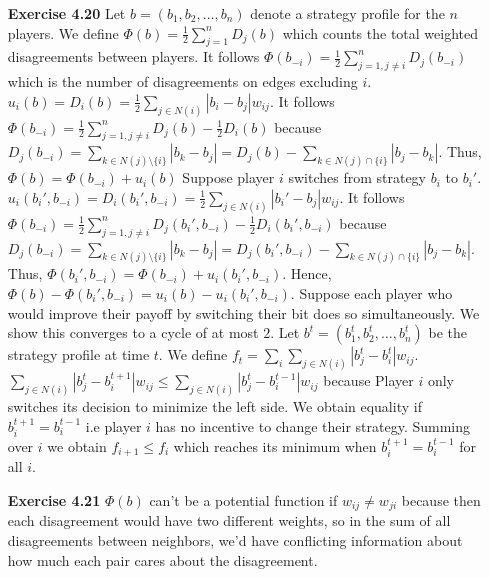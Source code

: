 \documentclass[10pt]{article}[H]
\begin{document}
\begin{itemize}
    \item [\textbf{Exercise 4.20}] Let $b=(b_1,b_2,\ldots,b_n)$ denote a strategy profile for the $n$ players. 
    We define $\Phi(b)=\frac{1}{2}\displaystyle\sum_{j=1}^{n}D_j(b)$ which counts the total weighted disagreements between players.
    It follows $\Phi(b_{-i})=\frac{1}{2}\displaystyle\sum_{j=1,j\neq i}^{n}D_j(b_{-i})$ which is the number of disagreements on edges excluding $i$.
    $u_i(b)=D_i(b)=\frac{1}{2}\sum_{j\in N(i)}|b_i-b_j|w_{ij}$.
    It follows $\Phi(b_{-i})=\frac{1}{2}\displaystyle\sum_{j=1,j\neq i}^{n}D_j(b)-\frac{1}{2}D_i(b)$ because $D_j(b_{-i})=\sum_{k\in N(j)\setminus\{i\}}|b_k-b_j|=D_j(b)-\sum_{k\in N(j)\cap\{i\}}|b_j-b_k|$.
    Thus, $\Phi(b)=\Phi(b_{-i})+u_i(b)$
    Suppose player $i$ switches from strategy $b_i$ to $b_i'$.
    $u_i(b_i',b_{-i})=D_i(b_i',b_{-i})=\frac{1}{2}\sum_{j\in N(i)}|b_i'-b_j|w_{ij}$.
    It follows $\Phi(b_{-i})=\frac{1}{2}\displaystyle\sum_{j=1,j\neq i}^{n}D_j(b_i',b_{-i})-\frac{1}{2}D_i(b_i',b_{-i})$ because $D_j(b_{-i})=\sum_{k\in N(j)\setminus\{i\}}|b_k-b_j|=D_j(b_i',b_{-i})-\sum_{k\in N(j)\cap\{i\}}|b_j-b_k|$.
    Thus, $\Phi(b_i',b_{-i})=\Phi(b_{-i})+u_i(b_i',b_{-i})$. 
    Hence, $\Phi(b)-\Phi(b_i',b_{-i})=u_i(b)-u_i(b_i',b_{-i})$.
    Suppose each player who would improve their payoff by switching their bit does so simultaneously. We show this converges to a cycle of at most $2$.
    Let $b^t=(b_1^t,b_2^t,\ldots,b_n^t)$ be the strategy profile at time $t$. We define $f_t=\sum_{i}\sum_{j\in N(i)}|b_j^t-b_i^t|w_{ij}$. $\sum_{j\in N(i)}|b_j^{t}-b_i^{t+1}|w_{ij}\le\sum_{j\in N(i)}|b_j^{t}-b_i^{t-1}|w_{ij}$ because Player $i$ only switches its decision to minimize the left side.
    We obtain equality if $b_i^{t+1}=b_i^{t-1}$ i.e player $i$ has no incentive to change their strategy. 
    Summing over $i$ we obtain $f_{i+1}\le f_i$ which reaches its minimum when $b_i^{t+1}=b_i^{t-1}$ for all $i$.
    \item [\textbf{Exercise 4.21}] $\Phi(b)$ can't be a potential function if $w_{ij}\neq w_{ji}$ because then each disagreement would have two different weights, so in the sum of all disagreements between neighbors, we'd have conflicting information about how much each pair cares about the disagreement.
\end{itemize}
\end{document}
